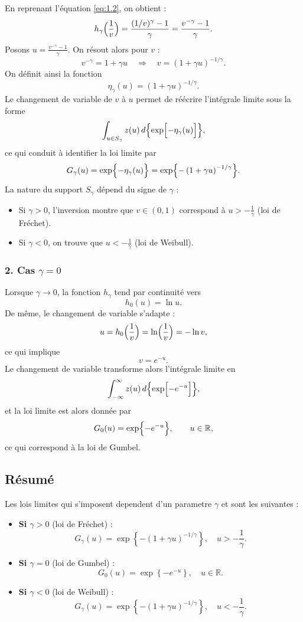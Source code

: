 \documentclass{article}
\begin{document}
En reprenant l'équation \eqref{eq:1.2}, on obtient :
\[
h_\gamma\Bigl(\frac{1}{v}\Bigr)=\frac{(1/v)^\gamma-1}{\gamma}=\frac{v^{-\gamma}-1}{\gamma}.
\]
Posons \(u=\frac{v^{-\gamma}-1}{\gamma}\). On résout alors pour \(v\) :
\[
v^{-\gamma}=1+\gamma u\quad\Longrightarrow\quad v=(1+\gamma u)^{-1/\gamma}.
\]
On définit ainsi la fonction
\[
\eta_\gamma(u)=(1+\gamma u)^{-1/\gamma}.
\]
Le changement de variable de \(v\) à \(u\) permet de réécrire l'intégrale limite sous la forme
\[
\int_{u\in S_\gamma} z(u)\,d\Bigl\{\exp\Bigl[-\eta_\gamma(u)\Bigr]\Bigr\},
\]
ce qui conduit à identifier la loi limite par
\[
G_\gamma(u)=\exp\Bigl\{-\eta_\gamma(u)\Bigr\}=\exp\Bigl\{-\left(1+\gamma u\right)^{-1/\gamma}\Bigr\}.
\]
La nature du support \(S_\gamma\) dépend du signe de \(\gamma\) :
\begin{itemize}
    \item Si \(\gamma>0\), l'inversion montre que \(v\in(0,1)\) correspond à \(u>-\frac{1}{\gamma}\) (loi de Fréchet).
    \item Si \(\gamma<0\), on trouve que \(u<-\frac{1}{\gamma}\) (loi de Weibull).
\end{itemize}
\subsubsection{2. Cas \(\gamma=0\)}
Lorsque \(\gamma\to0\), la fonction \(h_\gamma\) tend par continuité vers
\[
h_0(u)=\ln u.
\]
De même, le changement de variable s'adapte : 
\[
u=h_0\Bigl(\frac{1}{v}\Bigr)=\ln\Bigl(\frac{1}{v}\Bigr)=-\ln v,
\]
ce qui implique
\[
v=e^{-u}.
\]
Le changement de variable transforme alors l'intégrale limite en
\[
\int_{-\infty}^{\infty} z(u)\,d\Bigl\{\exp\Bigl[-e^{-u}\Bigr]\Bigr\},
\]
et la loi limite est alors donnée par
\[
G_0(u)=\exp\Bigl\{-e^{-u}\Bigr\},\qquad u\in\mathbb{R},
\]
ce qui correspond à la loi de Gumbel.
\\
\subsection{Résumé}
Les lois limites qui s'imposent dependent d'un parametre $\gamma$ et sont les suivantes :
\\
\begin{itemize}
    \item \textbf{Si \(\gamma>0\)} (loi de Fréchet) :
    \[
    G_\gamma(u)=\exp\left\{-\left(1+\gamma u\right)^{-1/\gamma}\right\}, \quad u > -\frac{1}{\gamma}.
    \]
    
    \item \textbf{Si \(\gamma=0\)} (loi de Gumbel) :
    \[
    G_0(u)=\exp\left\{-e^{-u}\right\}, \quad u\in\mathbb{R}.
    \]
    
    \item \textbf{Si \(\gamma<0\)} (loi de Weibull) :
    \[
    G_\gamma(u)=\exp\left\{-\left(1+\gamma u\right)^{-1/\gamma}\right\}, \quad u < -\frac{1}{\gamma}.
    \]
\end{itemize}
\newpage
\end{document}
